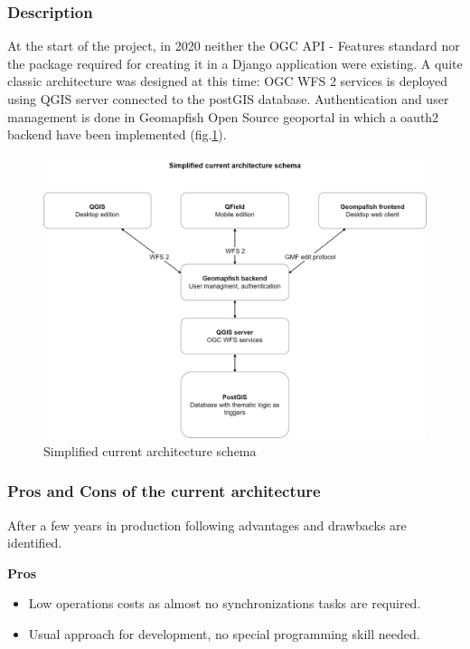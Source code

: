 \documentclass[runningheads]{llncs}
\begin{document}
\subsubsection{Description}

At the start of the project, in 2020 neither the OGC API - Features standard nor the package required for creating it in a Django application were existing. A quite classic architecture was designed at this time: OGC WFS 2 services is deployed using QGIS server connected to the postGIS database. Authentication and user management is done in Geomapfish Open Source geoportal in which a oauth2 backend have been implemented (fig.\ref{fig3}).

\begin{figure}
	\includegraphics[width=\textwidth]{architecture.drawio.png}
	\caption{Simplified current architecture schema} \label{fig3}
\end{figure}


\subsubsection{Pros and Cons of the current architecture}

After a few years in production following advantages and drawbacks are identified.

\textbf{Pros} 
\begin{itemize}
	\item Low operations costs as almost no synchronizations tasks are required.
	\item Usual approach for development, no special programming skill needed. 
\end{itemize}
\end{document}
